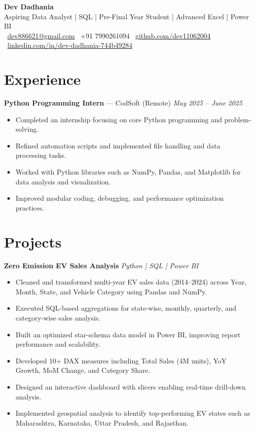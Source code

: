 \documentclass[a4paper,9pt]{article}
\begin{document}
\begin{center}
    {\LARGE \textbf{Dev Dadhania}} \\[4pt]
    Aspiring Data Analyst \;|\; SQL \;|\; Pre-Final Year Student \;|\; Advanced Excel \;|\; Power BI \\[4pt]
    \faEnvelope\ \href{mailto:dev886621@gmail.com}{dev886621@gmail.com}
    \quad
    \faPhone\ +91 7990261094
    \quad
    \faGithub\ \href{https://github.com/dev11062004}{github.com/dev11062004}
    \quad
    \faLinkedin\ \href{https://www.linkedin.com/in/dev-dadhania-744b49284/}{linkedin.com/in/dev-dadhania-744b49284}
\end{center}

\section{Experience}
\textbf{Python Programming Intern} — CodSoft (Remote) \hfill \textit{May 2025 – June 2025}
\begin{itemize}
    \item Completed an internship focusing on core Python programming and problem-solving.
    \item Refined automation scripts and implemented file handling and data processing tasks.
    \item Worked with Python libraries such as NumPy, Pandas, and Matplotlib for data analysis and visualization.
    \item Improved modular coding, debugging, and performance optimization practices.
\end{itemize}

\section{Projects}

\textbf{Zero Emission EV Sales Analysis} \hfill \textit{Python | SQL | Power BI}
\begin{itemize}
    \item Cleaned and transformed multi-year EV sales data (2014–2024) across Year, Month, State, and Vehicle Category using Pandas and NumPy.
    \item Executed SQL-based aggregations for state-wise, monthly, quarterly, and category-wise sales analysis.
    \item Built an optimized star-schema data model in Power BI, improving report performance and scalability.
    \item Developed 10+ DAX measures including Total Sales (4M units), YoY Growth, MoM Change, and Category Share.
    \item Designed an interactive dashboard with slicers enabling real-time drill-down analysis.
    \item Implemented geospatial analysis to identify top-performing EV states such as Maharashtra, Karnataka, Uttar Pradesh, and Rajasthan.
\end{itemize}
\end{document}
